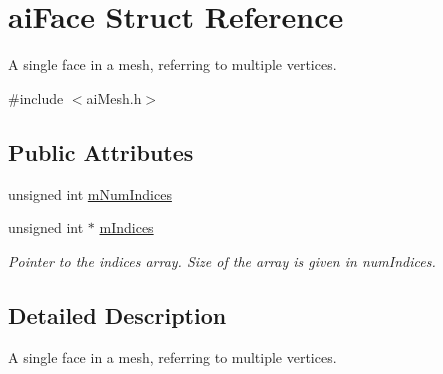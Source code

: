 \hypertarget{structai_face}{\section{ai\-Face Struct Reference}
\label{structai_face}
}


A single face in a mesh, referring to multiple vertices.  




{\ttfamily \#include $<$ai\-Mesh.\-h$>$}

\subsection*{Public Attributes}
\begin{DoxyCompactItemize}
\item 
unsigned int \hyperlink{structai_face_adda2698cec0ebfe651572f4a5701360b}{m\-Num\-Indices}
\item 
\hypertarget{structai_face_a2026b434c40cf1636f9f464a592ec36c}{unsigned int $\ast$ \hyperlink{structai_face_a2026b434c40cf1636f9f464a592ec36c}{m\-Indices}}\label{structai_face_a2026b434c40cf1636f9f464a592ec36c}

\begin{DoxyCompactList}\small\item\em Pointer to the indices array. Size of the array is given in num\-Indices. \end{DoxyCompactList}\end{DoxyCompactItemize}


\subsection{Detailed Description}
A single face in a mesh, referring to multiple vertices. 

